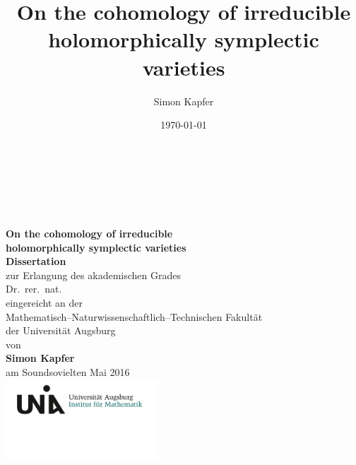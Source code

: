 \documentclass[11pt,twoside]{article}
\begin{document}
\title{
\bf On the cohomology of irreducible holomorphically symplectic varieties
}


\author{Simon Kapfer}


\date{\today}
\thispagestyle{empty}
\begin{center}
\ \\
\ \\
\ \\
\ \\
\textbf{ \LARGE On the cohomology of irreducible\\holomorphically symplectic varieties}
\\
\vspace{1cm}
\Large \textbf{Dissertation} \\
\textnormal\large zur Erlangung des akademischen Grades \\
\vspace{1mm}
Dr.~rer.~nat. \\
\vspace{8mm}
eingereicht an der \\
Mathematisch--Naturwissenschaftlich--Technischen Fakult\"at\\
der Universit\"at Augsburg
\\ \vspace{6mm}
von \\
\textbf{Simon Kapfer}\\
\vspace{5mm}
am Soundsovielten Mai 2016 \\
\vspace{12mm}
\includegraphics[height=30mm]{LogoInstitut.png}
\end{center}
\clearpage
\end{document}
